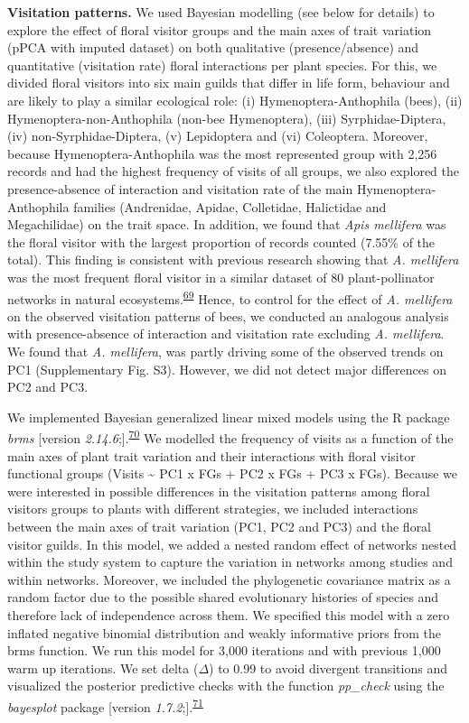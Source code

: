\documentclass[
  12pt,
  a4paper,
]{article}
\begin{document}
\textbf{Visitation patterns.} We used Bayesian modelling (see below for details) to explore the effect of floral visitor groups and the main axes of trait variation (pPCA with imputed dataset) on both qualitative (presence/absence) and quantitative (visitation rate) floral interactions per plant species. For this, we divided floral visitors into six main guilds that differ in life form, behaviour and are likely to play a similar ecological role: (i) Hymenoptera-Anthophila (bees), (ii) Hymenoptera-non-Anthophila (non-bee Hymenoptera), (iii) Syrphidae-Diptera, (iv) non-Syrphidae-Diptera, (v) Lepidoptera and (vi) Coleoptera. Moreover, because Hymenoptera-Anthophila was the most represented group with 2,256 records and had the highest frequency of visits of all groups, we also explored the presence-absence of interaction and visitation rate of the main Hymenoptera-Anthophila families (Andrenidae, Apidae, Colletidae, Halictidae and Megachilidae) on the trait space. In addition, we found that \emph{Apis mellifera} was the floral visitor with the largest proportion of records counted (7.55\% of the total). This finding is consistent with previous research showing that \emph{A. mellifera} was the most frequent floral visitor in a similar dataset of 80 plant-pollinator networks in natural ecosystems.\textsuperscript{\protect\hyperlink{ref-hung2018}{69}} Hence, to control for the effect of \emph{A. mellifera} on the observed visitation patterns of bees, we conducted an analogous analysis with presence-absence of interaction and visitation rate excluding \emph{A. mellifera}. We found that \emph{A. mellifera}, was partly driving some of the observed trends on PC1 (Supplementary Fig. S3). However, we did not detect major differences on PC2 and PC3.

We implemented Bayesian generalized linear mixed models using the R package \emph{brms} {[}version \emph{2.14.6};{]}.\textsuperscript{\protect\hyperlink{ref-burkner2017}{70}} We modelled the frequency of visits as a function of the main axes of plant trait variation and their interactions with floral visitor functional groups (Visits \textasciitilde{} PC1 x FGs + PC2 x FGs + PC3 x FGs). Because we were interested in possible differences in the visitation patterns among floral visitors groups to plants with different strategies, we included interactions between the main axes of trait variation (PC1, PC2 and PC3) and the floral visitor guilds. In this model, we added a nested random effect of networks nested within the study system to capture the variation in networks among studies and within networks. Moreover, we included the phylogenetic covariance matrix as a random factor due to the possible shared evolutionary histories of species and therefore lack of independence across them. We specified this model with a zero inflated negative binomial distribution and weakly informative priors from the brms function. We run this model for 3,000 iterations and with previous 1,000 warm up iterations. We set delta (\(\Delta\)) to 0.99 to avoid divergent transitions and visualized the posterior predictive checks with the function \emph{pp\_check} using the \emph{bayesplot} package {[}version \emph{1.7.2};{]}.\textsuperscript{\protect\hyperlink{ref-gabry2019}{71}}
\end{document}
